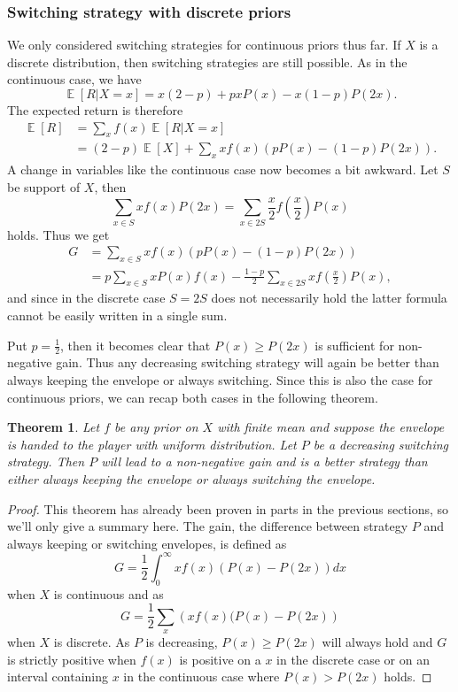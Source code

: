 \documentclass[twoside,a4paper]{article}
\theoremstyle{plain}
\newtheorem{theorem}{Theorem}[section]
\theoremstyle{definition}
\theoremstyle{remark}
\numberwithin{equation}{section}
\DeclareMathOperator{\E}{\mathbb{E}}
\DeclareMathOperator{\1}{\mathbbm{1}}
\begin{document}
\subsubsection{Switching strategy with discrete priors}
We only considered switching strategies for continuous priors thus far. If $X$ is a discrete distribution, then switching strategies are still possible. As in the continuous case, we have
\[\E[R|X=x]=x(2-p)+pxP(x)-x(1-p)P(2x).\]
The expected return is therefore
\begin{align*}
\E[R]&=\sum_x f(x)\E[R|X=x]\\
&=(2-p)\E[X]+\sum_x xf(x)(pP(x)-(1-p)P(2x)).
\end{align*}
A change in variables like the continuous case now becomes a bit awkward. Let $S$ be support of $X$, then \[\sum_{x\in S}xf(x)P(2x)=\sum_{x\in2S}\frac{x}{2}f\left(\frac{x}{2}\right)P(x)\] holds. Thus we get
\begin{align*}
G&=\sum_{x\in S}xf(x)(pP(x)-(1-p)P(2x))\\
&=p\sum_{x\in S}xP(x)f(x)-\frac{1-p}{2}\sum_{x\in2S}xf\left(\frac{x}{2}\right)P(x),
\end{align*}
and since in the discrete case $S=2S$ does not necessarily hold the latter formula cannot be easily written in a single sum.

Put $p=\frac{1}{2}$, then it becomes clear that $P(x)\geq P(2x)$ is sufficient for non-negative gain. Thus any decreasing switching strategy will again be better than always keeping the envelope or always switching. Since this is also the case for continuous priors, we can recap both cases in the following theorem.

\begin{theorem}\label{thm:switchall}
Let $f$ be any prior on $X$ with finite mean and suppose the envelope is handed to the player with uniform distribution. Let $P$ be a decreasing switching strategy. Then $P$ will lead to a non-negative gain and is a better strategy than either always keeping the envelope or always switching the envelope.
\end{theorem}
\begin{proof}
This theorem has already been proven in parts in the previous sections, so we'll only give a summary here. The gain, the difference between strategy $P$ and always keeping or switching envelopes, is defined as
\[G=\frac{1}{2}\int_0^\infty xf(x)(P(x)-P(2x))dx\]
when $X$ is continuous and as
\[G=\frac{1}{2}\sum_x\left(xf(x)(P(x)-P(2x)\right)\]
when $X$ is discrete. As $P$ is decreasing, $P(x)\geq P(2x)$ will always hold and $G$ is strictly positive when $f(x)$ is positive on a $x$ in the discrete case or on an interval containing $x$ in the continuous case where $P(x)>P(2x)$ holds.
\end{proof}
\end{document}
